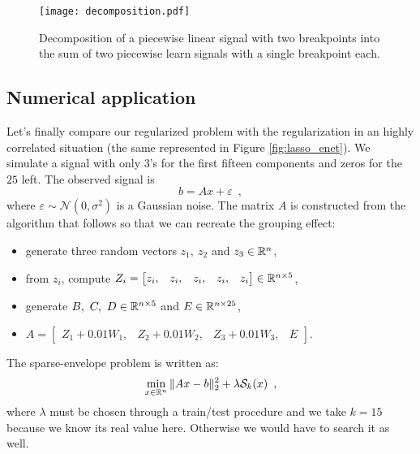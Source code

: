 \begin{figure}[H]
    \centering
    \texttt{[image: decomposition.pdf]}
    \caption{Decomposition of a piecewise linear signal with two breakpoints into the sum of two piecewise learn signals with a single breakpoint each.}
    \label{fig:decomposition}
\end{figure}

\subsection{Numerical application}

Let's finally compare our regularized problem with the \enet
regularization in an highly correlated situation (the same represented in Figure \ref{fig:lasso_enet}).
We simulate a signal with only $3$'s for the first fifteen components and zeros for the $25$ left. The observed signal is 
\[ b = Ax + \varepsilon\enspace,\]
where $\varepsilon\sim\mathcal{N}(0,\sigma^2)$ is a Gaussian noise.
The matrix $A$ is constructed from the algorithm that follows so that we can recreate the grouping effect:
\begin{itemize}
\setlength{\arraycolsep}{1pt} %
    \item generate three random vectors $z_1,\ z_2$ and $z_3\in\mathbb{R}^n$,
    \item from $z_i$, compute $Z_i=\begin{bmatrix} z_i, & z_i, & z_i, & z_i, & z_i\end{bmatrix}\in\mathbb{R}^{n\times 5}$,
    \item generate $B,\ C,\ D\in\mathbb{R}^{n\times 5}$ and $E\in\mathbb{R}^{n\times 25}$,
    \item $A=\begin{bmatrix}Z_1 + 0.01 W_1, & Z_2 + 0.01 W_2, & Z_3 + 0.01 W_3, & E \end{bmatrix}$.
\end{itemize}


The sparse-envelope problem is written as:
\[\min_{x\in \mathbb{R}^n} \|Ax-b\|^2_2 + \lambda\mathcal{S}_k(x)\enspace,\]
where $\lambda$ must be chosen through a train/test procedure and we take $k=15$ because we know its real value here. Otherwise we would have to search it as well.

